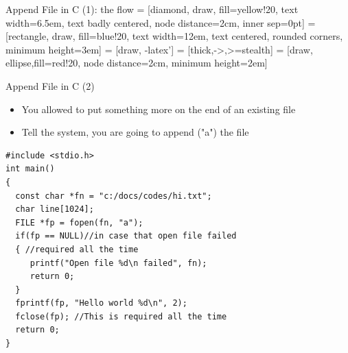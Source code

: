 \begin{frame}[fragile]{Append File in C (1): the flow}
 = [diamond, draw, fill=yellow!20, 
    text width=6.5em, text badly centered, node distance=2cm, inner sep=0pt]
 = [rectangle, draw, fill=blue!20, 
    text width=12em, text centered, rounded corners, minimum height=3em]
 = [draw, -latex']
 = [thick,->,>=stealth]
 = [draw, ellipse,fill=red!20, node distance=2cm,
    minimum height=2em]
\begin{center}


\end{center}
\end{frame}

\begin{frame}[fragile]{Append File in C (2)}
\vspace{-0.15in}
\begin{itemize}
	\item {You allowed to put something more on the end of an existing file}
	\item {Tell the system, you are going to append ("a") the file}
\end{itemize}
\begin{lstlisting}[xleftmargin=0.06\linewidth, linewidth=0.85\linewidth]
#include <stdio.h>
int main()
{
  const char *fn = "c:/docs/codes/hi.txt";
  char line[1024];
  FILE *fp = fopen(fn, "a");
  if(fp == NULL)//in case that open file failed
  { //required all the time
     printf("Open file %d\n failed", fn);
     return 0;
  }
  fprintf(fp, "Hello world %d\n", 2);
  fclose(fp); //This is required all the time
  return 0;
}
\end{lstlisting}
\end{frame}

